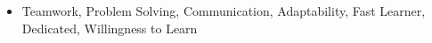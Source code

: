 %
%
%

\twocolumnsection
{
	\begin{skills}
	\end{skills}}
{
	\vspace{1em}
	\begin{itemize}
		\item Teamwork, Problem Solving, Communication, Adaptability, Fast Learner, Dedicated, Willingness to Learn
	\end{itemize}
}
